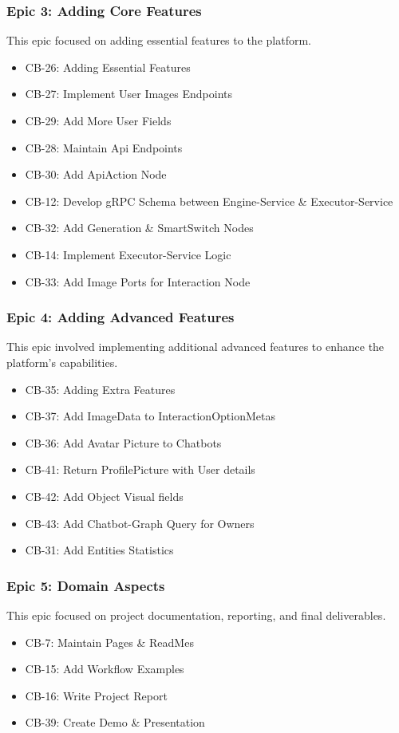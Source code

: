 \subsubsection{Epic 3: Adding Core Features}
This epic focused on adding essential features to the platform.
\begin{itemize}
    \item CB-26: Adding Essential Features
    \item CB-27: Implement User Images Endpoints
    \item CB-29: Add More User Fields
    \item CB-28: Maintain Api Endpoints
    \item CB-30: Add ApiAction Node
    \item CB-12: Develop gRPC Schema between Engine-Service \& Executor-Service
    \item CB-32: Add Generation \& SmartSwitch Nodes
    \item CB-14: Implement Executor-Service Logic
    \item CB-33: Add Image Ports for Interaction Node
\end{itemize}

\subsubsection{Epic 4: Adding Advanced Features}
This epic involved implementing additional advanced features to enhance the platform's capabilities.
\begin{itemize}
    \item CB-35: Adding Extra Features
    \item CB-37: Add ImageData to InteractionOptionMetas
    \item CB-36: Add Avatar Picture to Chatbots
    \item CB-41: Return ProfilePicture with User details
    \item CB-42: Add Object Visual fields
    \item CB-43: Add Chatbot-Graph Query for Owners
    \item CB-31: Add Entities Statistics
\end{itemize}

\subsubsection{Epic 5: Domain Aspects}
This epic focused on project documentation, reporting, and final deliverables.
\begin{itemize}
    \item CB-7: Maintain Pages \& ReadMes
    \item CB-15: Add Workflow Examples
    \item CB-16: Write Project Report
    \item CB-39: Create Demo \& Presentation
\end{itemize}